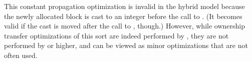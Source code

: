 This constant propagation optimization is invalid in the
hybrid model because the newly allocated block is cast to an
integer before the call to .  (It becomes valid if the
cast is moved after the call to , though.)  However, while
ownership transfer optimizations of this sort are indeed performed by
, they are not performed by  or
higher, and can be viewed as minor optimizations that are not often
used.









